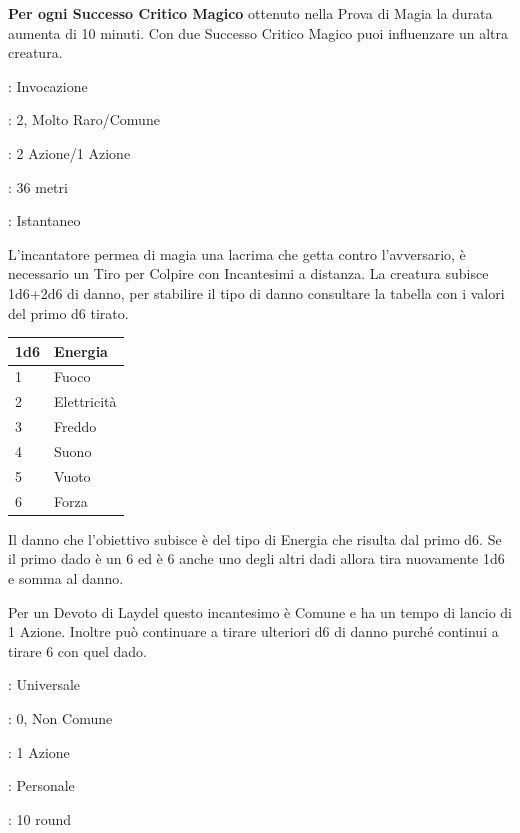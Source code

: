 \begin{multicols}{2}
\textbf{Per ogni Successo Critico Magico} ottenuto nella Prova di Magia la durata aumenta di 10 minuti. Con due Successo Critico Magico puoi influenzare un altra creatura.

\noindent\colorbox{OBSSgold!10}{
\begin{minipage}{0.95\linewidth}
\begin{description}[noitemsep, topsep=0pt, parsep=0pt, partopsep=0pt, leftmargin=0cm, labelwidth=1.3cm]
	\item[\textbf{Lista}]: Invocazione
	\item[\textbf{Livello}]: 2, Molto Raro/Comune
	\item[\textbf{Lancio}]: 2 Azione/1 Azione
	\item[\textbf{Gittata}]: 36 metri
	\item[\textbf{Durata}]: Istantaneo
\end{description}
\end{minipage}}\smallskip

L'incantatore permea di magia una lacrima che getta contro l'avversario, è necessario un Tiro per Colpire con Incantesimi a distanza.
La creatura subisce 1d6+2d6 di danno, per stabilire il tipo di danno consultare la tabella con i valori del primo d6 tirato.

\medskip

\noindent\begin{tabular}{l|l}
	\toprule
	\textbf{1d6}&\textbf{Energia}\\
	\toprule
	1 &Fuoco\\
	2 &Elettricità\\
	3 &Freddo\\
	4 &Suono\\
	5 &Vuoto\\
	6 &Forza
\end{tabular}

\medskip

Il danno che l'obiettivo subisce è del tipo di Energia che risulta dal primo d6. Se il primo dado è un 6 ed è 6 anche uno degli altri dadi allora tira nuovamente 1d6 e somma al danno.

Per un Devoto di Laydel questo incantesimo è Comune e ha un tempo di lancio di 1 Azione. Inoltre può continuare a tirare ulteriori d6 di danno purché continui a tirare 6 con quel dado.

\noindent\colorbox{OBSSgold!10}{
\begin{minipage}{0.95\linewidth}
\begin{description}[noitemsep, topsep=0pt, parsep=0pt, partopsep=0pt, leftmargin=0cm, labelwidth=1.3cm]
	\item[\textbf{Lista}]: Universale
	\item[\textbf{Livello}]: 0, Non Comune
	\item[\textbf{Lancio}]: 1 Azione
	\item[\textbf{Gittata}]: Personale
	\item[\textbf{Durata}]: 10 round
\end{description}
\end{minipage}}\smallskip


\end{multicols}
